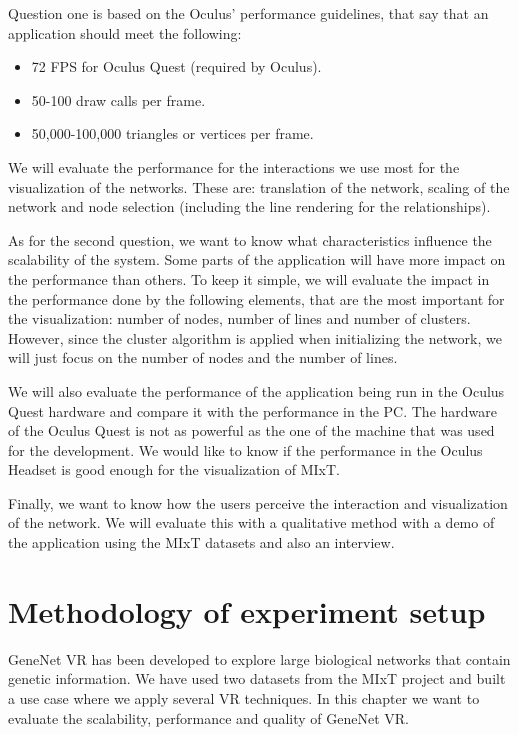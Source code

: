 Question one is based on the Oculus' performance guidelines\cite{oculus_performance_baselines}, that say that an application should meet the following:
\begin{itemize}
  \item 72 FPS for Oculus Quest (required by Oculus).
  \item 50-100 draw calls per frame.
  \item 50,000-100,000 triangles or vertices per frame.
\end{itemize}

We will evaluate the performance for the interactions we use most for the visualization of the networks. These are: translation of the network, scaling of the network and node selection (including the line rendering for the relationships).

As for the second question, we want to know what characteristics influence the scalability of the system. Some parts of the application will have more impact on the performance than others. To keep it simple, we will evaluate the impact in the performance done by the following elements, that are the most important for the visualization: number of nodes,  number of lines and number of clusters. However, since the cluster algorithm is applied when initializing the network, we will just focus on the number of nodes and the number of lines.

We will also evaluate the performance of the application being run in the Oculus Quest hardware and compare it with the performance in the PC. The hardware of the Oculus Quest is not as powerful as the one of the machine that was used for the development. We would like to know if the performance in the Oculus Headset is good enough for the visualization of MIxT.

Finally, we want to know how the users perceive the interaction and visualization of the network. We will evaluate this with a qualitative method with a demo of the application using the MIxT datasets and also an interview.

\section{Methodology of experiment setup}
GeneNet VR has been developed to explore large biological networks that contain genetic information. We have used two datasets from the MIxT project \cite{dumeaux_fjukstad_interactions_tumor_blood} and built a use case where we apply several VR techniques. In this chapter we want to evaluate the scalability, performance and quality of GeneNet VR.

